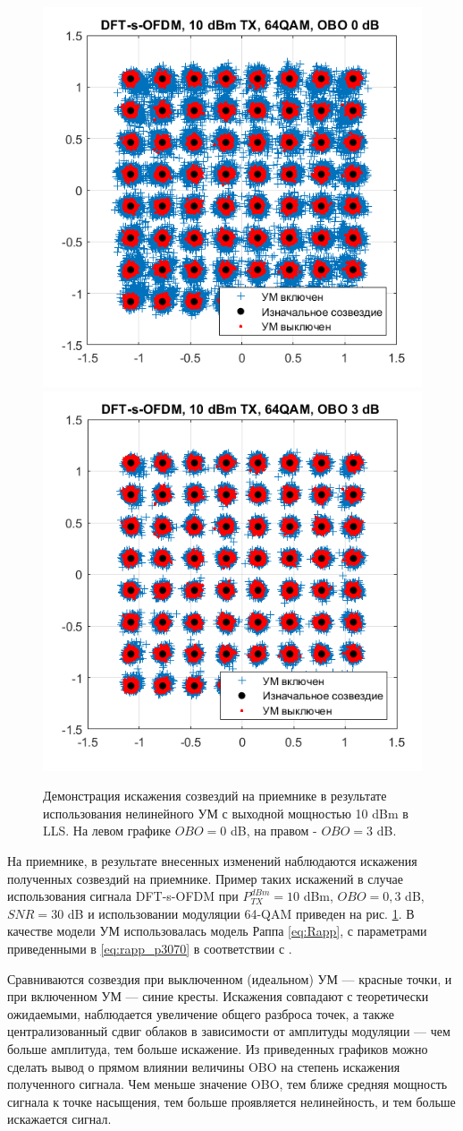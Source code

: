 \begin{figure}[h!]
    \centering
    \includegraphics[width=0.49\linewidth]{figs/dfts_10dbm_obo0.png}
    \includegraphics[width=0.49\linewidth]{figs/dfts_10dbm_obo3.png}
    \caption{Демонстрация искажения созвездий на приемнике в результате
    использования нелинейного УМ с выходной мощностью 10 dBm в LLS. На левом
    графике $OBO=0$ dB, на правом - $OBO=3$ dB.}
    \label{fig:lls_rapp_distortions_10dbm}
\end{figure}

На приемнике, в результате внесенных изменений наблюдаются искажения
полученных созвездий на приемнике. Пример таких искажений в случае
использования сигнала DFT-s-OFDM при $P^{dBm}_{TX} = 10$ dBm, $OBO = 0,3$
dB, $SNR=30$ dB и использовании модуляции 64-QAM приведен на рис.
\ref{fig:lls_rapp_distortions_10dbm}. В качестве модели УМ использовалась
модель Раппа \ref{eq:Rapp}, с параметрами приведенными в
\ref{eq:rapp_p3070} в соответствии с \cite{nokia163314}.


Сравниваются созвездия при выключенном (идеальном) УМ — красные точки, и
при включенном УМ — синие кресты.
Искажения совпадают с теоретически ожидаемыми, наблюдается увеличение
общего разброса точек, а также централизованный сдвиг облаков в зависимости
от амплитуды модуляции — чем больше амплитуда, тем больше искажение.
Из приведенных графиков можно сделать вывод о прямом влиянии величины OBO
на степень искажения полученного сигнала. Чем меньше значение OBO, тем
ближе средняя мощность сигнала к точке насыщения, тем больше проявляется
нелинейность, и тем больше искажается сигнал.

